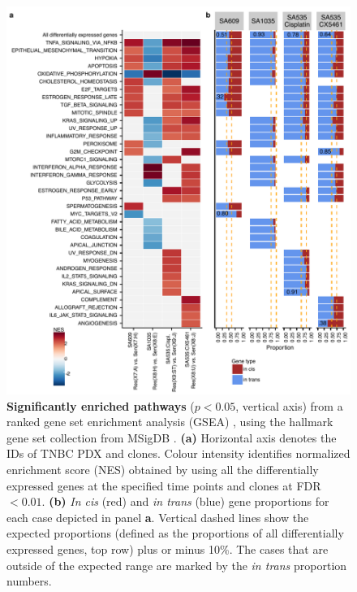 \begin{figure}
\centering
  \includegraphics[width=\textwidth]{Figures/chap5/fig13_common_pathways.pdf}
\caption[Gene pathway enrichment analysis of PDX timeseries]
	{\small
	\textbf{Significantly enriched pathways} ($p < 0.05$, vertical axis) from a ranked gene set enrichment analysis (GSEA) \cite{shi2007gene}, using the hallmark gene set collection from MSigDB \cite{liberzon2015molecular}. \textbf{(a)} Horizontal axis denotes the IDs of TNBC PDX and clones. Colour intensity identifies normalized enrichment score (NES) obtained by using all the differentially expressed genes at the specified time points and clones at FDR $< 0.01$. \textbf{(b)} \textit{In cis} (red) and \textit{in trans} (blue) gene proportions for each case depicted in panel \textbf{a}. Vertical dashed lines show the expected proportions (defined as the proportions of all differentially expressed genes, top row) plus or minus 10\%. The cases that are outside of the expected range are marked by the \textit{in trans} proportion numbers.
	}
	\label{fig:pathwaysnetwork}
\end{figure}

